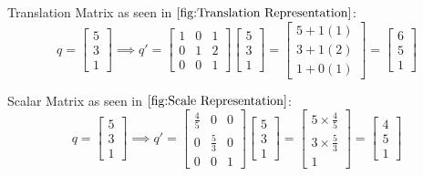 \documentclass[
    12pt,
    twoside,
    bibstyle=chicago,
    headerstyle=uppercase,
	bibfile=thesis_updating.bib
]{reedthesis}
\begin{document}

Translation Matrix as seen in $\ref{fig:Translation Representation}$:
\[q = \begin{bmatrix}5\\3\\1\end{bmatrix} \implies q' = \begin{bmatrix}1&0&1\\0&1&2\\0&0&1\end{bmatrix}\begin{bmatrix}5\\3\\1\end{bmatrix} = \begin{bmatrix}5 + 1(1)\\3 + 1(2)\\1 + 0(1)\end{bmatrix}= \begin{bmatrix}6\\5\\1\end{bmatrix}\]

Scalar Matrix as seen in $\ref{fig:Scale Representation}$:
\[q = \begin{bmatrix}5\\3\\1\end{bmatrix} \implies q' = \begin{bmatrix}\frac{4}{5}&0&0\\0&\frac{5}{3}&0\\0&0&1\end{bmatrix}\begin{bmatrix}5\\3\\1\end{bmatrix} = \begin{bmatrix}5 \times \frac{4}{5}\\3 \times \frac{5}{3}\\1\end{bmatrix}= \begin{bmatrix}4\\5\\1\end{bmatrix}\]
\end{document}
